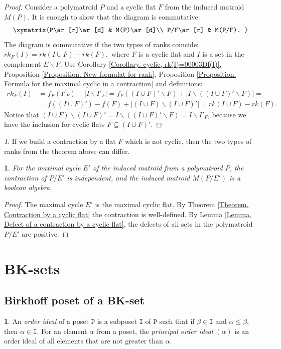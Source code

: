 \documentclass[11pt]{article}
\theoremstyle{plain}
\theoremstyle{definition}
\newtheorem{defn}[thm]{\protect\definitionname}
\theoremstyle{remark}
\newtheorem{rem}[thm]{\protect\remarkname}
\theoremstyle{plain}
\theoremstyle{plain}
\theoremstyle{plain}
\newtheorem{cor}[thm]{\protect\corollaryname}
\theoremstyle{definition}
\providecommand{\corollaryname}{Corollary}
\providecommand{\definitionname}{Definition}
\providecommand{\remarkname}{Remark}
\begin{document}
\begin{proof}
Consider a polymatroid $P$ and a cyclic flat $F$ from the induced
matroid $M(P).$ It is enough to show that the diagram is commutative:
\[
\xymatrix{P\ar[r]\ar[d] & M(P)\ar[d]\\
P/F\ar[r] & M(P/F).
}
\]
The diagram is commutative if the two types of ranks coincide: $rk_{F}(I)=rk(I\cup F)-rk(F),$
where $F$ is a cyclic flat and $I$ is a set in the complement $E\backslash F$.
Use Corollary \ref{Corollary. cyclic, rk(I)=00003Df(I)}, Proposition
\ref{Proposition. New formulat for rank}, Proposition \ref{Proposition. Formula for the maximal cyclic in a contraction}
and definitions:
\begin{align*}
rk_{F}(I) & =f_{F}(I'_{F})+|I\backslash I'_{F}|=f_{F}((I\cup F)'\backslash F)+|I\backslash\left((I\cup F)'\backslash F\right)|=\\
 & =f((I\cup F)')-f(F)+|(I\cup F)\backslash(I\cup F)'|=rk(I\cup F)-rk(F).
\end{align*}
Notice that $(I\cup F)\backslash(I\cup F)'=I\backslash\left((I\cup F)'\backslash F\right)=I\backslash I'_{F}$,
because we have the inclusion for cyclic flats $F\subseteq(I\cup F)'$.
\end{proof}
\begin{rem}
If we build a contraction by a flat $F$ which is not cyclic, then
the two types of ranks from the theorem above can differ.
\end{rem}

\begin{cor}
\label{Corollary. Contraction by maximal cyclic is independent}For
the maximal cycle $E'$ of the induced matroid from a polymatroid
$P$, the contraction of $P/E'$ is independent, and the induced matroid
$M(P/E')$ is a boolean algebra.
\end{cor}

\begin{proof}
The maximal cycle $E'$ is the maximal cyclic flat. By Theorem \ref{Theorem. Contraction by a cyclic flat}
the contraction is well-defined. By Lemma \ref{Lemma. Defect of a contraction by a cyclic flat},
the defects of all sets in the polymatroid $P/E'$ are positive.
\end{proof}

\section{BK-sets}

\subsection{Birkhoff poset of a BK-set}
\begin{defn}
An \textit{order ideal} of a poset $\mathtt{P}$ is a subposet $\mathtt{I}$
of $\mathtt{P}$ such that if $\beta\in\mathtt{I}$ and $\alpha\leq\beta$,
then $\alpha\in\mathtt{I}$. For an element $\alpha$ from a poset,
the \textit{principal order ideal }$(\alpha)$ is an order ideal of
all elements that are not greater than $\alpha.$
\end{defn}
\end{document}
